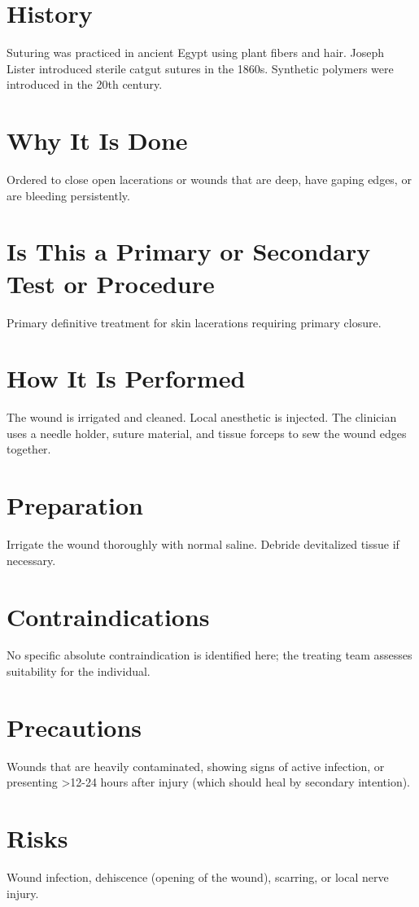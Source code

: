 \section*{History}
Suturing was practiced in ancient Egypt using plant fibers and hair. Joseph Lister introduced sterile catgut sutures in the 1860s. Synthetic polymers were introduced in the 20th century.

\section*{Why It Is Done}
Ordered to close open lacerations or wounds that are deep, have gaping edges, or are bleeding persistently.

\section*{Is This a Primary or Secondary Test or Procedure}
Primary definitive treatment for skin lacerations requiring primary closure.

\section*{How It Is Performed}
The wound is irrigated and cleaned. Local anesthetic is injected. The clinician uses a needle holder, suture material, and tissue forceps to sew the wound edges together.

\section*{Preparation}
Irrigate the wound thoroughly with normal saline. Debride devitalized tissue if necessary.

\section*{Contraindications}
No specific absolute contraindication is identified here; the treating team assesses suitability for the individual.

\section*{Precautions}
Wounds that are heavily contaminated, showing signs of active infection, or presenting >12-24 hours after injury (which should heal by secondary intention).

\section*{Risks}
Wound infection, dehiscence (opening of the wound), scarring, or local nerve injury.

